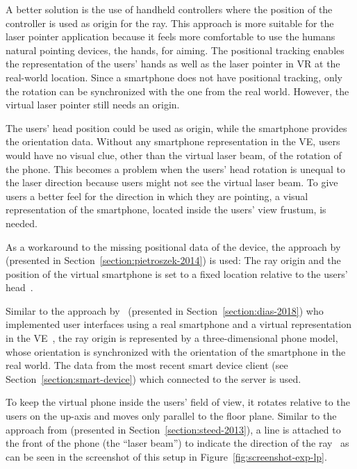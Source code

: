 A better solution is the use of handheld controllers where the position of the controller is used as origin for the ray. This approach is more suitable for the laser pointer application because it feels more comfortable to use the humans natural pointing devices, the hands, for aiming. The positional tracking enables the representation of the users' hands as well as the laser pointer in \gls{VR} at the real-world location. Since a smartphone does not have positional tracking, only the rotation can be synchronized with the one from the real world. However, the virtual laser pointer still needs an origin.

The users' head position could be used as origin, while the smartphone provides the orientation data. Without any smartphone representation in the \gls{VE}, users would have no visual clue, other than the virtual laser beam, of the rotation of the phone. This becomes a problem when the users' head rotation is unequal to the laser direction because users might not see the virtual laser beam. To give users a better feel for the direction in which they are pointing, a visual representation of the smartphone, located inside the users' view frustum, is needed.

As a workaround to the missing positional data of the device, the approach by \citeauthor{Pietroszek.2014} (presented in Section~\ref{section:pietroszek-2014}) is used: The ray origin and the position of the virtual smartphone is set to a fixed location relative to the users' head~\cite[Figure 3]{Pietroszek.2014}. %

Similar to the approach by~\citeauthor{Dias.2018} (presented in Section~\ref{section:dias-2018}) who implemented user interfaces using a real smartphone and a virtual representation in the \gls{VE}~\cite[5]{Dias.2018}, the ray origin is represented by a three-dimensional phone model, whose orientation is synchronized with the orientation of the smartphone in the real world. The data from the most recent smart device client (see Section~\ref{section:smart-device}) which connected to the server is used.

To keep the virtual phone inside the users' field of view, it rotates relative to the users on the up-axis and moves only parallel to the floor plane.
Similar to the approach from \citeauthor{Steed.2013} (presented in Section~\ref{section:steed-2013}), a line is attached to the front of the phone (the \enquote{laser beam}) to indicate the direction of the ray~\cite[46]{Steed.2013} as can be seen in the screenshot of this setup in Figure~\ref{fig:screenshot-exp-lp}.

